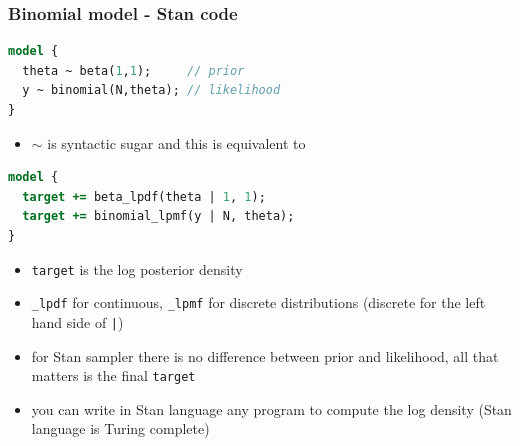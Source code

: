 \documentclass[10pt,handout]{beamer}
\begin{document}
\begin{frame}[fragile]

\frametitle{Binomial model - Stan code}

  {\small
\begin{lstlisting}[language=Stan]
model {
  theta ~ beta(1,1);     // prior
  y ~ binomial(N,theta); // likelihood
}
\end{lstlisting}}

    \vspace{-0.5\baselineskip}
    \begin{itemize}
    \item $\sim$ is syntactic sugar and this is equivalent to
    \end{itemize}

  {\small
\begin{lstlisting}[language=Stan]
model {
  target += beta_lpdf(theta | 1, 1);
  target += binomial_lpmf(y | N, theta);
}
\end{lstlisting}}

    \vspace{-0.5\baselineskip}
    \begin{itemize}
    \item<2-> {\tt target} is the log posterior density
    \item<3-> {\tt \_lpdf} for continuous, {\tt \_lpmf} for discrete distributions (discrete for the left hand side of {\tt |})
    \item<4-> for Stan sampler there is no difference between prior and likelihood, all that matters is the final {\tt target}
    \item<5-> you can write in Stan language any program to compute the
      log density (Stan language is Turing complete)
    \end{itemize}

\end{frame}




\end{document}
